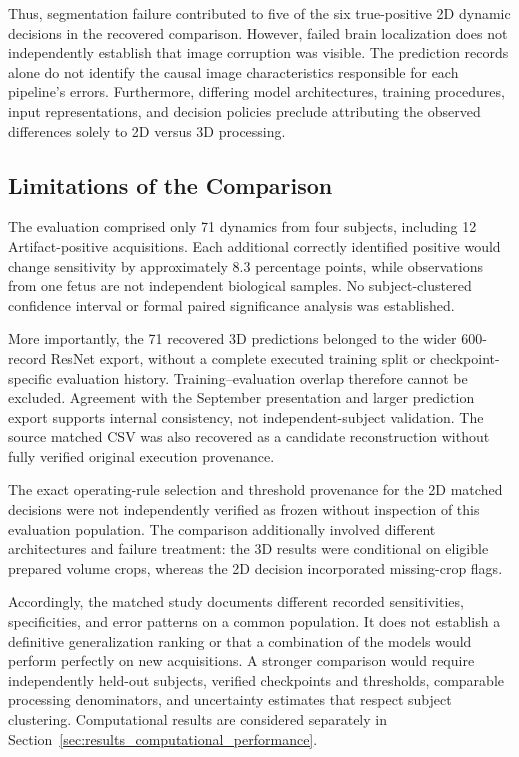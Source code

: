 Thus, segmentation failure contributed to five of the six true-positive 2D dynamic decisions in the recovered comparison. However, failed brain localization does not independently establish that image corruption was visible. The prediction records alone do not identify the causal image characteristics responsible for each pipeline's errors. Furthermore, differing model architectures, training procedures, input representations, and decision policies preclude attributing the observed differences solely to 2D versus 3D processing.

\subsection{Limitations of the Comparison}
\label{subsec:results_matched_pipeline_limitations}

The evaluation comprised only 71 dynamics from four subjects, including 12 Artifact-positive acquisitions. Each additional correctly identified positive would change sensitivity by approximately 8.3 percentage points, while observations from one fetus are not independent biological samples. No subject-clustered confidence interval or formal paired significance analysis was established.

More importantly, the 71 recovered 3D predictions belonged to the wider 600-record ResNet export, without a complete executed training split or checkpoint-specific evaluation history. Training--evaluation overlap therefore cannot be excluded. Agreement with the September presentation and larger prediction export supports internal consistency, not independent-subject validation. The source matched CSV was also recovered as a candidate reconstruction without fully verified original execution provenance.

The exact operating-rule selection and threshold provenance for the 2D matched decisions were not independently verified as frozen without inspection of this evaluation population. The comparison additionally involved different architectures and failure treatment: the 3D results were conditional on eligible prepared volume crops, whereas the 2D decision incorporated missing-crop flags.

Accordingly, the matched study documents different recorded sensitivities, specificities, and error patterns on a common population. It does not establish a definitive generalization ranking or that a combination of the models would perform perfectly on new acquisitions. A stronger comparison would require independently held-out subjects, verified checkpoints and thresholds, comparable processing denominators, and uncertainty estimates that respect subject clustering. Computational results are considered separately in Section~\ref{sec:results_computational_performance}.

